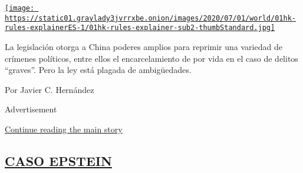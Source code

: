 \begin{enumerate}
\begin{enumerate}
    \href{/es/2020/07/01/espanol/mundo/china-ley-seguridad-Hong-Kong.html}{\texttt{[image: https://static01.graylady3jvrrxbe.onion/images/2020/07/01/world/01hk-rules-explainerES-1/01hk-rules-explainer-sub2-thumbStandard.jpg]}}

    La legislación otorga a China poderes amplios para reprimir una
    variedad de crímenes políticos, entre ellos el encarcelamiento de
    por vida en el caso de delitos ``graves''. Pero la ley está plagada
    de ambigüedades.

    Por Javier C. Hernández
  \end{enumerate}
\end{enumerate}

Advertisement

\protect\hyperlink{after-mid1}{Continue reading the main story}

\hypertarget{caso-epstein}{%
\subsection{\texorpdfstring{\protect\hyperlink{}{CASO
EPSTEIN}}{CASO EPSTEIN}}\label{caso-epstein}}

